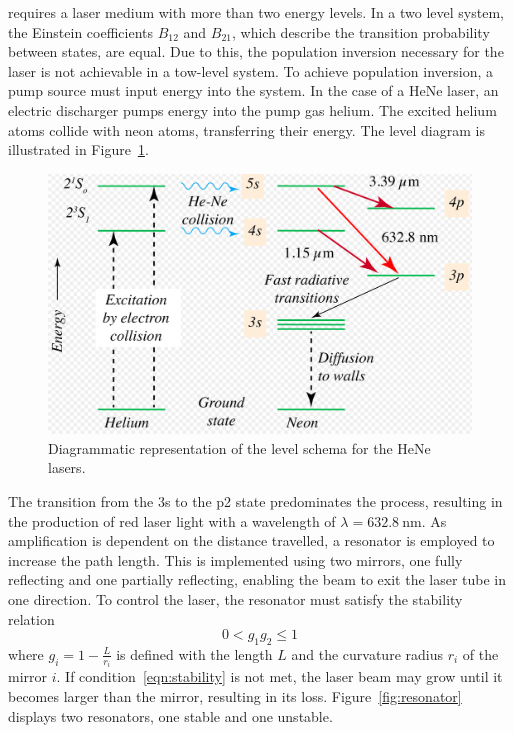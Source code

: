 requires a laser medium with more than two energy levels. In a two
level system, the Einstein coefficients $B_{12}$ and $B_{21}$, which 
describe the transition probability between states, are equal. Due to 
this, the population inversion necessary for the laser is not achievable
in a tow-level system.
\noindent
To achieve population inversion, a pump source must input energy
into the system. In the case of a HeNe laser, an electric discharger 
pumps energy into the pump gas helium. The excited helium atoms 
collide with neon atoms, transferring their energy. The level diagram is
illustrated in Figure~\ref{fig:level}.
\begin{figure}
    \centering
    \includegraphics[width=0.7\linewidth]{pictures/level.png} %
    \caption{Diagrammatic representation of the level schema for the HeNe lasers. \cite{Wikipedia}}
    \label{fig:level}
\end{figure}
The transition from the 3s to the p2 state predominates the process, 
resulting in the production of red laser light with a wavelength of
$\lambda = \SI{632.8}{\nano\meter}$.
\noindent
As amplification is dependent on the distance travelled, a resonator is
employed to increase the path length. This is implemented using two
mirrors, one fully reflecting and one partially reflecting, enabling
the beam to exit the laser tube in one direction.
\noindent
To control the laser, the resonator must satisfy the stability relation
\begin{equation}
    0 < g_1g_2 \leq 1
    \label{eqn:stability}
\end{equation}
\noindent
where $g_i=1-\frac{L}{r_i}$ is defined with the length $L$ and the 
curvature radius $r_i$ of the mirror $i$. If condition~\eqref{eqn:stability}
is not met, the laser beam may grow until it becomes larger than the mirror,
resulting in its loss. Figure~\ref{fig:resonator} displays two resonators,
one stable and one unstable.
